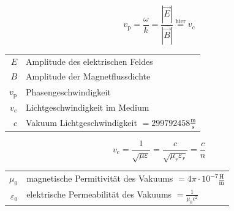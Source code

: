 	  \begin{center}
		  
		  \begin{minipage}{.5\linewidth}
			  \[
				  v_\mathrm{p} = \frac{\omega}{k} = \frac{|\vec{E}|}{|\vec{B}|} \stackrel{\text{hier}}{=} v_\mathrm{c}
			  \]
			  \begin{tabular}{r@{${}={}$}p{.8\linewidth}}
				  $E$   & Amplitude des elektrischen Feldes                                            \\
				  $B$   & Amplitude der Magnetflussdichte                                              \\
				  $v_\mathrm{p}$ & Phasengeschwindigkeit                                                        \\
				  $v_\mathrm{c}$ & Lichtgeschwindigkeit im Medium                                               \\
				  $c$   & \raggedright   Vakuum Lichtgeschwindigkeit $= 299792458\mathrm{\frac{m}{s}}$
			  \end{tabular}
		  \end{minipage}%
		  \begin{minipage}{.5\linewidth}
			  \[
				  v_\mathrm{c} = \frac{1}{\sqrt{\mu \varepsilon}} =\frac{c}{\sqrt{\mu_r \varepsilon_r}} = \frac{c}{n}
			  \]
			  \begin{tabular}{r@{${}={}$}p{.8\linewidth}}
				  $\mu_0$         & magnetische Permitivität des Vakuums $= 4\pi\cdot 10^{-7}\mathrm{\frac{H}{m}}$ \\
				  $\varepsilon_0$ & \raggedright  elektrische Permeabilität des Vakuums $= \frac{1}{\mu_0 c^2}$
			  \end{tabular}
		  \end{minipage}
	  \end{center}
